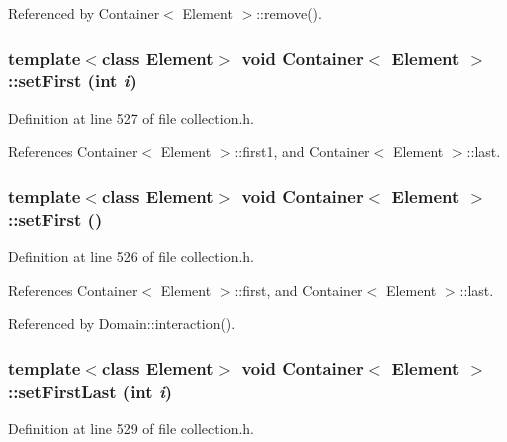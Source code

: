Referenced by Container$<$ Element $>$::remove().\hypertarget{classContainer_2a5774d0210d839861134fa1089a78b4}{
\subsubsection[{setFirst}]{\setlength{\rightskip}{0pt plus 5cm}template$<$class Element$>$ void {\bf Container}$<$ Element $>$::setFirst (int {\em i})}}
\label{classContainer_2a5774d0210d839861134fa1089a78b4}




Definition at line 527 of file collection.h.

References Container$<$ Element $>$::first1, and Container$<$ Element $>$::last.\hypertarget{classContainer_86eea8a215d10d9470fbf607bda54620}{
\subsubsection[{setFirst}]{\setlength{\rightskip}{0pt plus 5cm}template$<$class Element$>$ void {\bf Container}$<$ Element $>$::setFirst ()}}
\label{classContainer_86eea8a215d10d9470fbf607bda54620}




Definition at line 526 of file collection.h.

References Container$<$ Element $>$::first, and Container$<$ Element $>$::last.

Referenced by Domain::interaction().\hypertarget{classContainer_5bd91f600ca1279a1f0081914c6f3f90}{
\subsubsection[{setFirstLast}]{\setlength{\rightskip}{0pt plus 5cm}template$<$class Element$>$ void {\bf Container}$<$ Element $>$::setFirstLast (int {\em i})}}
\label{classContainer_5bd91f600ca1279a1f0081914c6f3f90}




Definition at line 529 of file collection.h.

